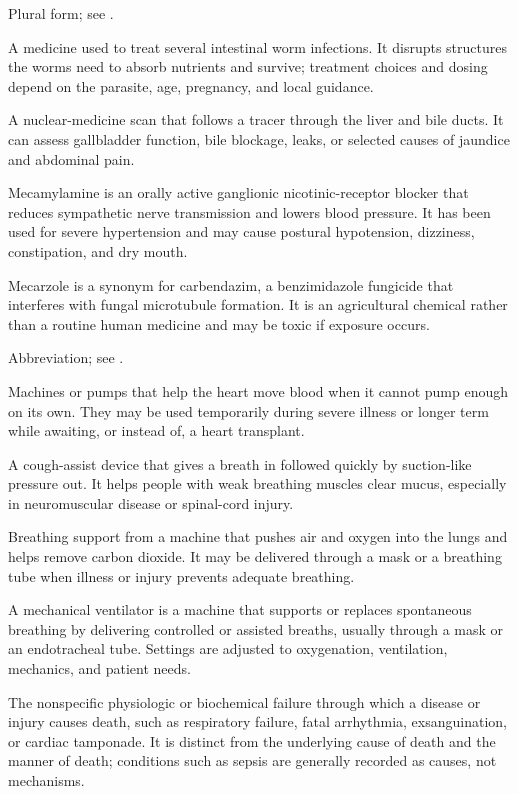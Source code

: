  Plural form; see .

 A medicine used to treat several intestinal worm infections. It disrupts structures the worms need to absorb nutrients and survive; treatment choices and dosing depend on the parasite, age, pregnancy, and local guidance.

 A nuclear-medicine scan that follows a tracer through the liver and bile ducts. It can assess gallbladder function, bile blockage, leaks, or selected causes of jaundice and abdominal pain.

 Mecamylamine is an orally active ganglionic nicotinic-receptor blocker that reduces sympathetic nerve transmission and lowers blood pressure. It has been used for severe hypertension and may cause postural hypotension, dizziness, constipation, and dry mouth.

 Mecarzole is a synonym for carbendazim, a benzimidazole fungicide that interferes with fungal microtubule formation. It is an agricultural chemical rather than a routine human medicine and may be toxic if exposure occurs.

 Abbreviation; see .

 Machines or pumps that help the heart move blood when it cannot pump enough on its own. They may be used temporarily during severe illness or longer term while awaiting, or instead of, a heart transplant.

 A cough-assist device that gives a breath in followed quickly by suction-like pressure out. It helps people with weak breathing muscles clear mucus, especially in neuromuscular disease or spinal-cord injury.

 Breathing support from a machine that pushes air and oxygen into the lungs and helps remove carbon dioxide. It may be delivered through a mask or a breathing tube when illness or injury prevents adequate breathing.

 A mechanical ventilator is a machine that supports or replaces spontaneous breathing by delivering controlled or assisted breaths, usually through a mask or an endotracheal tube. Settings are adjusted to oxygenation, ventilation, mechanics, and patient needs.

 The nonspecific physiologic or biochemical failure through which a disease or injury causes death, such as respiratory failure, fatal arrhythmia, exsanguination, or cardiac tamponade. It is distinct from the underlying cause of death and the manner of death; conditions such as sepsis are generally recorded as causes, not mechanisms.

